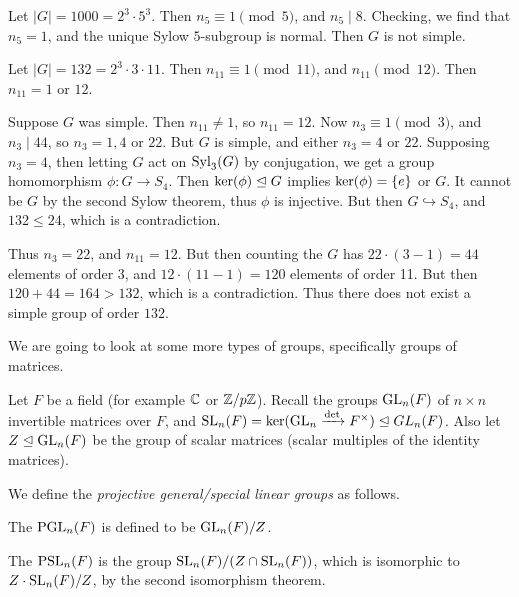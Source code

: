 \documentclass[a4paper]{scrartcl}
\begin{document}
\begin{example}
Let $|G| = 1000 = 2^3 \cdot 5^3$. Then $n_5 \equiv 1 \pmod{5}$, and $n_5 \mid 8$. Checking, we find that $n_5 = 1$, and the unique Sylow $5$-subgroup is normal. Then $G$ is not simple.
\end{example}


\begin{example}
	Let $|G| = 132 = 2^3 \cdot 3 \cdot 11$. Then $n_{11} \equiv 1 \pmod{11}$, and $n_{11} \pmod 12$. Then $n_{11} = 1$ or $12$. 

	Suppose $G$ was simple. Then $n_{11} \neq 1$, so $n_{11} = 12$. Now $n_3 \equiv 1 \pmod{3}$, and $n_3 \mid 44$, so $n_3 = 1, 4$ or $22$. But $G$ is simple, and either $n_3 = 4$ or $22$. Supposing $n_3 = 4$, then letting $G$ act on $\operatorname{Syl}_3(G)$ by conjugation, we get a group homomorphism $\phi: G \rightarrow S_4$. Then $\operatorname{ker}(\phi) \trianglelefteq G$ implies $\operatorname{ker}(\phi) = \{e\}$ or $G$. It cannot be $G$ by the second Sylow theorem, thus $\phi$ is injective. But then $G \hookrightarrow S_4$, and $132 \leq 24$, which is a contradiction.

	Thus $n_3 = 22$, and $n_11 = 12$. But then counting the $G$ has $22 \cdot (3 - 1) = 44$ elements of order 3, and $12 \cdot (11 - 1) = 120$ elements of order 11. But then $120 + 44 = 164 > 132$, which is a contradiction. Thus there does not exist a simple group of order $132$. 
\end{example}


We are going to look at some more types of groups, specifically groups of matrices.


Let $F$ be a field (for example $\mathbb{C}$ or $\mathbb{Z}/p\mathbb{Z}$). 
Recall the groups $\operatorname{GL}_n(F)$ of $n \times n$ 
invertible matrices over $F$, and $\operatorname{SL}_n(F) = \operatorname{ker}(\operatorname{GL}_n \xrightarrow{\det} F^\times) \trianglelefteq GL_n(F)$.
Also let $Z \trianglelefteq \operatorname{GL}_n(F)$ be the group of scalar matrices (scalar multiples of the identity matrices). 

We define the \emph{projective general/special linear groups} as follows.

\begin{definition}
	The  $\operatorname{PGL}_n(F)$ is defined to be $\operatorname{GL}_n(F) / Z$.
\end{definition}

\begin{definition}
	The  $\operatorname{PSL}_n(F)$ is the group $\operatorname{SL}_n(F) / (Z \cap  \operatorname{SL}_n(F))$, which is isomorphic to $Z\cdot \operatorname{SL}_n(F) / Z$, by the second isomorphism theorem.
\end{definition}
\end{document}
